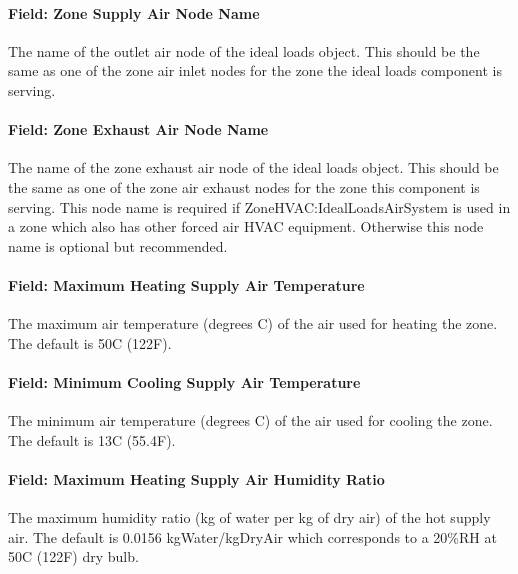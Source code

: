 \paragraph{Field: Zone Supply Air Node Name}\label{field-zone-supply-air-node-name-001}

The name of the outlet air node of the ideal loads object. This should be the same as one of the zone air inlet nodes for the zone the ideal loads component is serving.

\paragraph{Field: Zone Exhaust Air Node Name}\label{field-zone-exhaust-air-node-name}

The name of the zone exhaust air node of the ideal loads object. This should be the same as one of the zone air exhaust nodes for the zone this component is serving. This node name is required if ZoneHVAC:IdealLoadsAirSystem is used in a zone which also has other forced air HVAC equipment. Otherwise this node name is optional but recommended.

\paragraph{Field: Maximum Heating Supply Air Temperature}\label{field-maximum-heating-supply-air-temperature-000}

The maximum air temperature (degrees C) of the air used for heating the zone. The default is 50C (122F).

\paragraph{Field: Minimum Cooling Supply Air Temperature}\label{field-minimum-cooling-supply-air-temperature-000}

The minimum air temperature (degrees C) of the air used for cooling the zone. The default is 13C (55.4F).

\paragraph{Field: Maximum Heating Supply Air Humidity Ratio}\label{field-maximum-heating-supply-air-humidity-ratio-000}

The maximum humidity ratio (kg of water per kg of dry air) of the hot supply air. The default is 0.0156 kgWater/kgDryAir which corresponds to a 20\%RH at 50C (122F) dry bulb.

